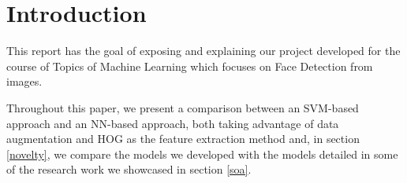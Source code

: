 \section{Introduction}
This report has the goal of exposing and explaining our project developed for the course of Topics of Machine Learning which focuses on Face Detection from images.

Throughout this paper, we present a comparison between an SVM-based approach and an NN-based approach, both taking advantage of data augmentation and HOG as the feature extraction method and, in section \ref{novelty}, we compare the models we developed with the models detailed in some of the research work we showcased in section \ref{soa}.